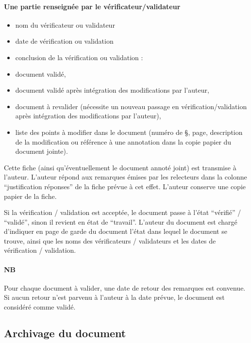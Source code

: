 \documentclass[a4paper]{article}
\begin{document}
\paragraph{Une partie renseignée par le vérificateur/validateur}

\begin{itemize}
\item nom du vérificateur ou validateur
\item date de vérification ou validation
\item conclusion de la vérification ou validation :
\item document validé,
\item document validé après intégration des modifications par l'auteur,
\item document à revalider (nécessite un nouveau passage en vérification/validation après intégration des modifications par l'auteur),
\item liste des points à modifier dans le document (numéro de §, page, description de la modification ou référence à une annotation dans la copie papier du document jointe).
\end{itemize}

Cette fiche (ainsi qu'éventuellement le document annoté joint) est transmise à l'auteur.
L'auteur répond aux remarques émises par les relecteurs dans la colonne ``justification réponses'' de la fiche prévue à cet effet.
L'auteur conserve une copie papier de la fiche.

Si la vérification / validation est acceptée, le document passe à l'état ``vérifié'' / ``validé'', sinon il revient en état de ``travail''.
L'auteur du document est chargé d'indiquer en page de garde du document l'état dans lequel le document se trouve, ainsi que les noms des vérificateurs / validateurs et les dates de vérification / validation.

\paragraph{NB}

Pour chaque document à valider, une date de retour des remarques est convenue. Si aucun retour n'est parvenu à l'auteur à la date prévue, le document est considéré comme validé.

\subsection{Archivage du document}
\end{document}
